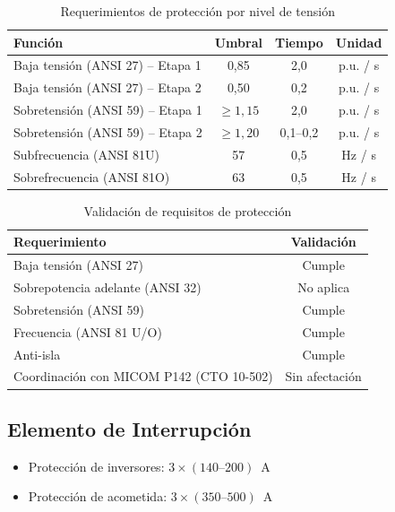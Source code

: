 \begin{table}[H]
    \centering
    \caption{Requerimientos de protección por nivel de tensión}
    \begin{tabular}{lccc}
    \toprule
    \textbf{Función} & \textbf{Umbral} & \textbf{Tiempo} & \textbf{Unidad} \\
    \midrule
    Baja tensión (ANSI 27) -- Etapa 1 & 0,85 & 2,0 & p.u. / s \\
    Baja tensión (ANSI 27) -- Etapa 2 & 0,50 & 0,2 & p.u. / s \\
    Sobretensión (ANSI 59) -- Etapa 1 & $\geq 1{,}15$ & 2,0 & p.u. / s \\
    Sobretensión (ANSI 59) -- Etapa 2 & $\geq 1{,}20$ & 0,1--0,2 & p.u. / s \\
    Subfrecuencia (ANSI 81U) & 57 & 0,5 & Hz / s \\
    Sobrefrecuencia (ANSI 81O) & 63 & 0,5 & Hz / s \\
    \bottomrule
    \end{tabular}
\end{table}

\begin{table}[H]
    \centering
    \caption{Validación de requisitos de protección}
    \begin{tabular}{lc}
    \toprule
    \textbf{Requerimiento} & \textbf{Validación} \\
    \midrule
    Baja tensión (ANSI 27) & Cumple \\
    Sobrepotencia adelante (ANSI 32) & No aplica \\
    Sobretensión (ANSI 59) & Cumple \\
    Frecuencia (ANSI 81 U/O) & Cumple \\
    Anti-isla & Cumple \\
    Coordinación con MICOM P142 (CTO 10-502) & Sin afectación \\
    \bottomrule
    \end{tabular}
\end{table}

\subsection{Elemento de Interrupción}

\begin{itemize}
    \item Protección de inversores: $3\times(140\textrm{--}200)$~A
    \item Protección de acometida: $3\times(350\textrm{--}500)$~A
\end{itemize}

